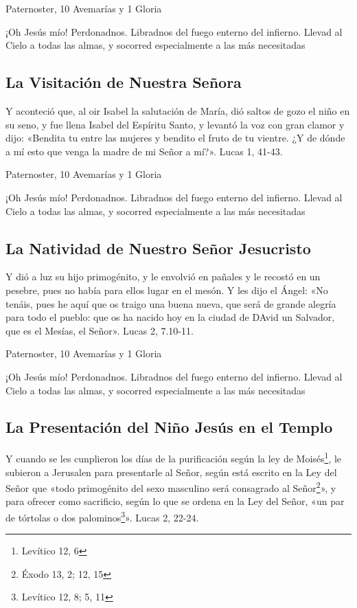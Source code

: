 \documentclass[a4paper,11pt, oneside]{report}
\begin{document}
       Paternoster, 10 Avemarías y 1 Gloria
      
      \medskip
      ¡Oh Jesús mío! Perdonadnos. Libradnos del fuego enterno del infierno. Llevad al Cielo a todas las almas, y socorred especialmente a las más 
      necesitadas

    \subsection*{La Visitación de Nuestra Señora}
      Y aconteció que, al oir Isabel la salutación de María, dió saltos de gozo el niño en su seno, y fue llena Isabel del Espíritu Santo, y levantó la voz con gran
      clamor y dijo: «Bendita tu entre las mujeres y bendito el fruto de tu vientre. ¿Y de dónde a mí esto que venga la madre de mi Señor a mí?». 
      Lucas 1, 41-43.
      
       Paternoster, 10 Avemarías y 1 Gloria
      
      \medskip
      ¡Oh Jesús mío! Perdonadnos. Libradnos del fuego enterno del infierno. Llevad al Cielo a todas las almas, y socorred especialmente a las más 
      necesitadas
                    
    \subsection*{La Natividad de Nuestro Señor Jesucristo}
      Y dió a luz su hijo primogénito, y le envolvió en pañales y le recostó en un pesebre, pues no había para ellos lugar en el mesón.
      Y les dijo el Ángel: «No tenáis, pues he aquí que os traigo una buena nueva, que será de grande alegría para todo el pueblo: que os ha nacido hoy en la ciudad de DAvid
      un Salvador, que es el Mesías, el Señor». Lucas 2, 7.10-11.
      
       Paternoster, 10 Avemarías y 1 Gloria
      
      \medskip
      ¡Oh Jesús mío! Perdonadnos. Libradnos del fuego enterno del infierno. Llevad al Cielo a todas las almas, y socorred especialmente a las más 
      necesitadas
  
    \subsection*{La Presentación del Niño Jesús en el Templo}
      Y cuando se les cunplieron los días de la purificación según la ley de Moisés\footnote{Levítico 12, 6}, le subieron a Jerusalen para presentarle al Señor, según está escrito
      en la Ley del Señor que «todo primogénito del sexo masculino será consagrado al Señor\footnote{Éxodo 13, 2; 12, 15}», y para ofrecer como sacrificio, según lo que 
      se ordena en la Ley del Señor, «un par de tórtolas o dos palominos\footnote{Levítico 12, 8; 5, 11}». Lucas 2, 22-24.
      
\end{document}
